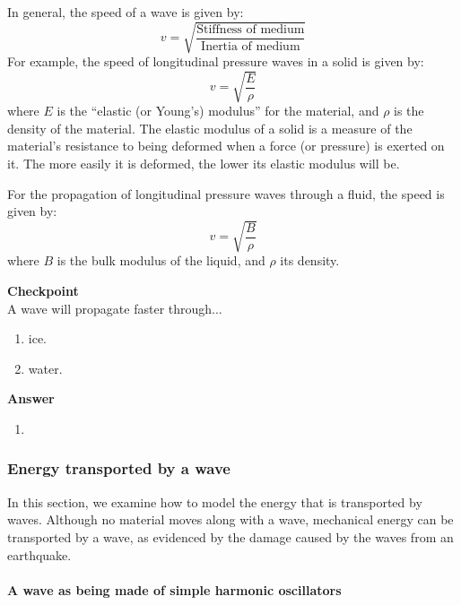 In general, the speed of a wave is given by:
\begin{equation}
v=\sqrt{\frac{\text{Stiffness of medium}}{\text{Inertia of medium}}}
\end{equation}
For example, the speed of longitudinal pressure waves in a solid is given by:
\begin{equation}
v=\sqrt{\frac{E}{\rho}}
\end{equation}
where $E$ is the ``elastic (or Young's) modulus'' for the material, and $\rho$ is the density of the material. The elastic modulus of a solid is a measure of the material's resistance to being deformed when a force (or pressure) is exerted on it. The more easily it is deformed, the lower its elastic modulus will be.

For the propagation of longitudinal pressure waves through a fluid, the speed is given by:
\begin{equation}
v=\sqrt{\frac{B}{\rho}}
\end{equation}
where $B$ is the bulk modulus of the liquid, and $\rho$ its density.

\begin{framed}
\textbf{Checkpoint}\\
A wave will propagate faster through...

\begin{enumerate}
\item ice.
\item water.
\end{enumerate}

\begin{framed}
\textbf{Answer}\\
\begin{enumerate}
\item
\end{enumerate}
\end{framed}
\end{framed}

\subsubsection{Energy transported by a wave}

In this section, we examine how to model the energy that is transported by waves. Although no material moves along with a wave, mechanical energy can be transported by a wave, as evidenced by the damage caused by the waves from an earthquake.

\paragraph{A wave as being made of simple harmonic oscillators}

